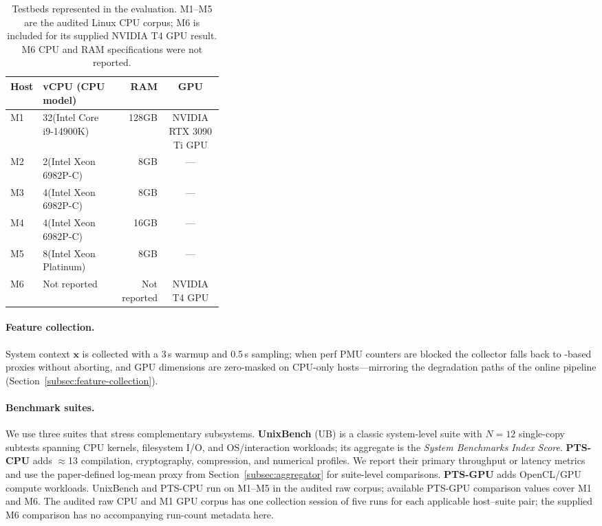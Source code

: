 \documentclass[sigconf, review, anonymous, balance=false]{acmart}
\begin{document}
\begin{table}[t]
\centering
\caption{Testbeds represented in the evaluation. M1--M5 are the audited Linux CPU corpus; M6 is included for its supplied NVIDIA T4 GPU result. M6 CPU and RAM specifications were not reported.}
\label{tab:testbeds}
\small
\setlength{\tabcolsep}{2pt}
\begin{tabular}{@{}lp{0.36\linewidth}rc@{}}
\toprule
\textbf{Host} & \textbf{vCPU (CPU model)} & \textbf{RAM} & \textbf{GPU} \\
\midrule
M1 & 32(Intel Core i9-14900K) & 128GB & NVIDIA RTX 3090 Ti GPU \\
M2 & 2(Intel Xeon 6982P-C) & 8GB & --- \\
M3 & 4(Intel Xeon 6982P-C) & 8GB & --- \\
M4 & 4(Intel Xeon 6982P-C) & 16GB & --- \\
M5 & 8(Intel Xeon Platinum) & 8GB & --- \\
M6 & Not reported & Not reported & NVIDIA T4 GPU \\
\bottomrule
\end{tabular}
\end{table}


\paragraph{Feature collection.}
System context $\mathbf{x}$ is collected with a 3\,s warmup and 0.5\,s  sampling; when perf PMU counters are blocked the collector falls back to -based proxies without aborting, and GPU dimensions are zero-masked on CPU-only hosts---mirroring the degradation paths of the online pipeline (Section~\ref{subsec:feature-collection}).



\paragraph{Benchmark suites.}
\label{subsubsec:benchmark-suites}
We use three suites that stress complementary subsystems.
\textbf{UnixBench} (UB) is a classic system-level suite with $N{=}12$ single-copy subtests spanning CPU kernels, filesystem I/O, and OS/interaction workloads; its aggregate is the \emph{System Benchmarks Index Score}.
\textbf{PTS-CPU} adds $\approx$13 compilation, cryptography, compression, and numerical profiles. We report their primary throughput or latency metrics and use the paper-defined log-mean proxy from Section~\ref{subsec:aggregator} for suite-level comparisons.
\textbf{PTS-GPU} adds OpenCL/GPU compute workloads.
UnixBench and PTS-CPU run on M1--M5 in the audited raw corpus; available PTS-GPU comparison values cover M1 and M6. The audited raw CPU and M1 GPU corpus has one collection session of five runs for each applicable host--suite pair; the supplied M6 comparison has no accompanying run-count metadata here.
\end{document}
